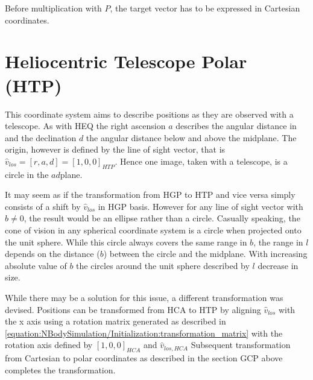 \documentclass[letterpaper,10pt,english]{sphinxmanual}
\begin{document}
\sphinxAtStartPar
Before multiplication with \(P\), the target vector has to be expressed in Cartesian coordinates.


\section{Heliocentric Telescope Polar (HTP)}
\label{\detokenize{NBodySimulation/CoordinateSystems:heliocentric-telescope-polar-htp}}
\sphinxAtStartPar
This coordinate system aims to describe positions as they are observed with a telescope.
As with HEQ the right ascension \(a\) describes the angular distance in and the declination \(d\) the angular distance below and above the midplane.
The origin, however is defined by the line of sight vector, that is \(\hat{v}_{los} = [r,a,d] = [1,0,0]_{HTP}\).
Hence one image, taken with a telescope, is a circle in the \(ad\)\sphinxhyphen{}plane.

\sphinxAtStartPar
It may seem as if the transformation from HGP to HTP and vice versa simply consists of a shift by \(\hat{v}_{los}\) in HGP basis.
However for any line of sight vector with \(b\neq0\), the result would be an ellipse rather than a circle.
Casually speaking, the cone of vision in any spherical coordinate system is a circle when projected onto the unit sphere.
While this circle always covers the same range in \(b\), the range in \(l\) depends on the distance (\(b\)) between the circle and the midplane.
With increasing absolute value of \(b\) the circles around the unit sphere described by \(l\) decrease in size.

\sphinxAtStartPar
While there may be a solution for this issue, a different transformation was devised.
Positions can be transformed from HCA to HTP by aligning \(\hat{v}_{los}\) with the x axis 
using a rotation matrix generated as described in \eqref{equation:NBodySimulation/Initialization:transformation_matrix} with the rotation axis defined by \([1,0,0]_{HCA}\) and \(\hat{v}_{los,HCA}\)
Subsequent transformation from Cartesian to polar coordinates as described in the section GCP above completes the transformation.
\end{document}
